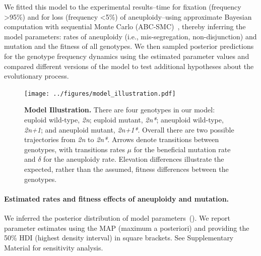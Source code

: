 \documentclass[12pt]{extarticle}
\newcommand{\euwt}{\emph{2n}}
\newcommand{\anwt}{\emph{2n+1}}
\newcommand{\eumt}{\emph{2n*}}
\newcommand{\anmt}{\emph{2n+1*}}
\begin{document}
We fitted this model to the experimental results\citep{Yona2012}--time for fixation (frequency >95\%) and for loss (frequency <5\%) of aneuploidy--using approximate Bayesian computation with sequential Monte Carlo (ABC-SMC)~\citep{Sisson2009}, thereby inferring the model parameters: rates of aneuploidy (i.e., mis-segregation, non-disjunction) and mutation and the fitness of all genotypes.
We then sampled posterior predictions for the genotype frequency dynamics using the estimated parameter values and compared different versions of the model to test additional hypotheses about the evolutionary process.


\begin{figure}[h]
  \centering
    \texttt{[image: ../figures/model\_illustration.pdf]}      
  \caption{
    \textbf{Model Illustration.}
    There are four genotypes in our model: euploid wild-type, \euwt; euploid mutant, \eumt; aneuploid wild-type, \anwt; and aneuploid mutant, \anmt.
    Overall there are two possible trajectories from \euwt\; to \eumt.
    Arrows denote transitions between genotypes, with transitions rates $\mu$ for the beneficial mutation rate and $\delta$ for the aneuploidy rate.
    Elevation differences illustrate the expected, rather than the assumed, fitness differences between the genotypes.
   }
  \label{fig:models}
\end{figure}


\paragraph{Estimated rates and fitness effects of aneuploidy and mutation.} 
We inferred the posterior distribution of model parameters~(). 
We report parameter estimates using the MAP (maximum a posteriori) and providing the 50\% HDI (highest density interval) in square brackets. See Supplementary Material for sensitivity analysis.
\end{document}
